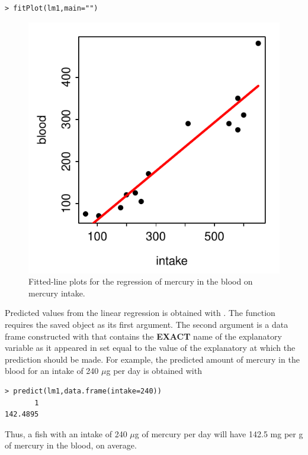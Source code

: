 \documentclass[10pt,openany]{book}\usepackage[]{graphicx}\usepackage[]{color}
\makeatletter
\newenvironment{kframe}{%
 \def\at@end@of@kframe{}%
 \ifinner\ifhmode%
  \def\at@end@of@kframe{\end{minipage}}%
  \begin{minipage}{\columnwidth}%
 \fi\fi%
 \def\FrameCommand##1{\hskip\@totalleftmargin \hskip-\fboxsep
 \colorbox{shadecolor}{##1}\hskip-\fboxsep
     \hskip-\linewidth \hskip-\@totalleftmargin \hskip\columnwidth}%
 \MakeFramed {\advance\hsize-\width
   \@totalleftmargin\z@ \linewidth\hsize
   \@setminipage}}%
 {\par\unskip\endMakeFramed%
 \at@end@of@kframe}
\newenvironment{knitrout}{}{} %
\makeatother
\begin{document}
\begin{knitrout}
\color{fgcolor}\begin{kframe}
\begin{verbatim}
> fitPlot(lm1,main="")
\end{verbatim}
\end{kframe}\begin{figure}[hbtp]

{\centering \includegraphics[width=.4\linewidth]{Figs/HGFLP-1} 

}

\caption[Fitted-line plots for the regression of mercury in the blood on mercury intake]{Fitted-line plots for the regression of mercury in the blood on mercury intake.}\label{fig:HGFLP}
\end{figure}


\end{knitrout}

Predicted values from the linear regression is obtained with .  The  function requires the saved   object as its first argument.  The second argument is a data frame constructed with  that contains the \textbf{EXACT} name of the explanatory variable as it appeared in  set equal to the value of the explanatory at which the prediction should be made.  For example, the predicted amount of mercury in the blood for an intake of 240 $\mu$g per day is obtained with
\begin{knitrout}
\color{fgcolor}\begin{kframe}
\begin{verbatim}
> predict(lm1,data.frame(intake=240))
       1 
142.4895 
\end{verbatim}
\end{kframe}
\end{knitrout}
Thus, a fish with an intake of 240 $\mu$g of mercury per day will have 142.5 mg per g of mercury in the blood, on average.
\end{document}
